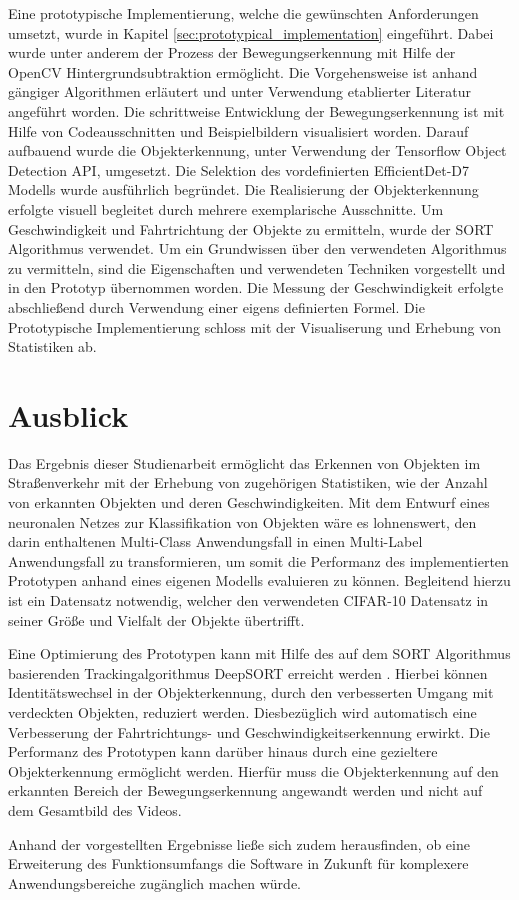Eine prototypische Implementierung, welche die gewünschten Anforderungen umsetzt, wurde in Kapitel \ref{sec:prototypical_implementation} eingeführt. Dabei wurde unter anderem der Prozess der Bewegungserkennung mit Hilfe der OpenCV Hintergrundsubtraktion ermöglicht. Die Vorgehensweise ist anhand gängiger Algorithmen erläutert und unter Verwendung etablierter Literatur angeführt worden. Die schrittweise Entwicklung der Bewegungserkennung ist mit Hilfe von Codeausschnitten und Beispielbildern visualisiert worden. Darauf aufbauend wurde die Objekterkennung, unter Verwendung der Tensorflow Object Detection \ac{API}, umgesetzt. Die Selektion des vordefinierten EfficientDet-D7 Modells wurde ausführlich begründet. Die Realisierung der Objekterkennung erfolgte visuell begleitet durch mehrere exemplarische Ausschnitte. Um Geschwindigkeit und Fahrtrichtung der Objekte zu ermitteln, wurde der \ac{SORT} Algorithmus verwendet. Um ein Grundwissen über den verwendeten Algorithmus zu vermitteln, sind die Eigenschaften und verwendeten Techniken vorgestellt und in den Prototyp übernommen worden. Die Messung der Geschwindigkeit erfolgte abschließend durch Verwendung einer eigens definierten Formel. Die Prototypische Implementierung schloss mit der Visualiserung und Erhebung von Statistiken ab. 

\section{Ausblick}

Das Ergebnis dieser Studienarbeit ermöglicht das Erkennen von Objekten im Straßenverkehr mit der Erhebung von zugehörigen Statistiken, wie der Anzahl von erkannten Objekten und deren Geschwindigkeiten. Mit dem Entwurf eines neuronalen Netzes zur Klassifikation von Objekten wäre es lohnenswert, den darin enthaltenen Multi-Class Anwendungsfall in einen Multi-Label Anwendungsfall zu transformieren, um somit die Performanz des implementierten Prototypen anhand eines eigenen Modells evaluieren zu können. Begleitend hierzu ist ein Datensatz notwendig, welcher den verwendeten \ac{CIFAR}-10 Datensatz in seiner Größe und Vielfalt der Objekte übertrifft. 

Eine Optimierung des Prototypen kann mit Hilfe des auf dem \ac{SORT} Algorithmus basierenden Trackingalgorithmus DeepSORT erreicht werden \cite{DBLP:journals/corr/WojkeBP17}. Hierbei können Identitätswechsel in der Objekterkennung, durch den verbesserten Umgang mit verdeckten Objekten, reduziert werden. Diesbezüglich wird automatisch eine Verbesserung der Fahrtrichtungs- und Geschwindigkeitserkennung erwirkt. Die Performanz des Prototypen kann darüber hinaus durch eine gezieltere Objekterkennung ermöglicht werden. Hierfür muss die Objekterkennung auf den erkannten Bereich der Bewegungserkennung angewandt werden und nicht auf dem Gesamtbild des Videos. 

Anhand der vorgestellten Ergebnisse ließe sich zudem herausfinden, ob eine Erweiterung des Funktionsumfangs die Software in Zukunft für komplexere Anwendungsbereiche zugänglich machen würde. 